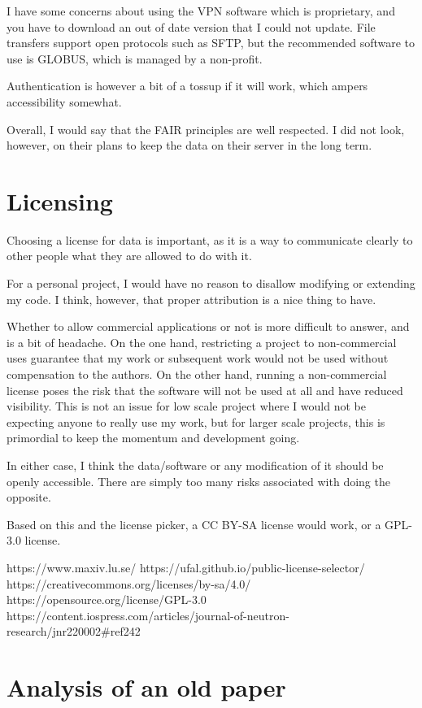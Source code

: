 \documentclass{article}
\begin{document}
I have some concerns about using the VPN software which is proprietary, and you have to download an out of date version that I could not update. File transfers support open protocols such as SFTP, but the recommended software to use is GLOBUS, which is managed by a non-profit. 

Authentication is however a bit of a tossup if it will work, which ampers accessibility somewhat. 

Overall, I would say that the FAIR principles are well respected. I did not look, however, on their plans to keep the data on their server in the long term.

\section{Licensing}

Choosing a license for data is important, as it is a way to communicate clearly to other people what they are allowed to do with it.

For a personal project, I would have no reason to disallow modifying or extending my code. I think, however, that proper attribution is a nice thing to have.

Whether to allow commercial applications or not is more difficult to answer, and is a bit of headache. On the one hand, restricting a project to non-commercial uses guarantee that my work or subsequent work would not be used without compensation to the authors. On the other hand, running a non-commercial license poses the risk that the software will not be used at all and have reduced visibility. This is not an issue for low scale project where I would not be expecting anyone to really use my work, but for larger scale projects, this is primordial to keep the momentum and development going.

In either case, I think the data/software or any modification of it should be openly accessible. There are simply too many risks associated with doing the opposite.

Based on this and the license picker, a CC BY-SA license would work, or a GPL-3.0 license. 


https://www.maxiv.lu.se/
https://ufal.github.io/public-license-selector/
https://creativecommons.org/licenses/by-sa/4.0/
https://opensource.org/license/GPL-3.0
https://content.iospress.com/articles/journal-of-neutron-research/jnr220002#ref242



\section{Analysis of an old paper}
\end{document}
